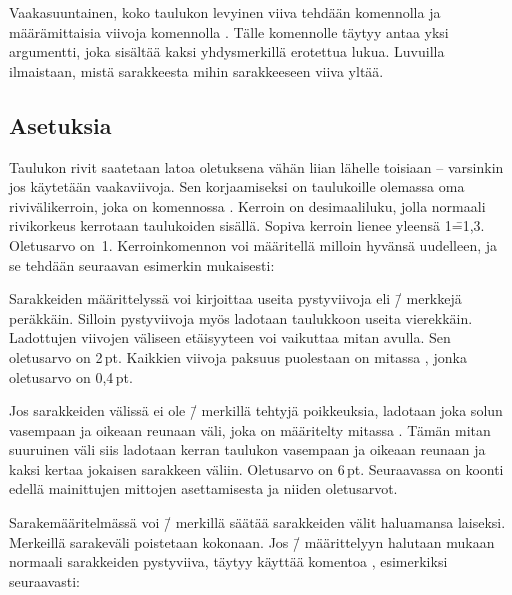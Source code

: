 Vaakasuuntainen, koko taulukon levyinen viiva tehdään komennolla
 ja määrämittaisia viivoja komennolla .
Tälle komennolle täytyy antaa yksi argumentti, joka sisältää kaksi
yhdysmerkillä erotettua lukua. Luvuilla ilmaistaan, mistä sarakkeesta
mihin sarakkeeseen viiva yltää.

\subsection{Asetuksia}

Taulukon rivit saatetaan latoa oletuksena vähän liian lähelle toisiaan
-- varsinkin jos käytetään vaakaviivoja. Sen korjaamiseksi on
taulukoille olemassa oma rivivälikerroin, joka on komennossa
. Kerroin on desimaaliluku, jolla normaali
rivikorkeus kerrotaan taulukoiden sisällä. Sopiva kerroin lienee yleensä
1\==1,3. Oletusarvo on~1. Kerroinkomennon voi määritellä milloin hyvänsä
uudelleen, ja se tehdään seuraavan esimerkin mukaisesti:

\begin{koodilohkosis}
\renewcommand{\arraystretch}{1.3}
\end{koodilohkosis}

\noindent
Sarakkeiden määrittelyssä voi kirjoittaa useita pystyviivoja eli
\koodi{|}\=/ merkkejä peräkkäin. Silloin pystyviivoja myös ladotaan
taulukkoon useita vierekkäin. Ladottujen viivojen väliseen etäisyyteen
voi vaikuttaa mitan  avulla. Sen oletusarvo on
2\,pt. Kaikkien viivoja paksuus puolestaan on mitassa
, jonka oletusarvo on 0,4\,pt.

Jos sarakkeiden välissä ei ole \=/ merkillä tehtyjä
poikkeuksia, ladotaan joka solun vasempaan ja oikeaan reunaan väli, joka
on määritelty mitassa . Tämän mitan suuruinen väli
siis ladotaan kerran taulukon vasempaan ja oikeaan reunaan ja kaksi
kertaa jokaisen sarakkeen väliin. Oletusarvo on 6\,pt. Seuraavassa on
koonti edellä mainittujen mittojen asettamisesta ja niiden oletusarvot.

\begin{koodilohkosis}
\setlength{\doublerulesep}{2pt}
\setlength{\arrayrulewidth}{.4pt}
\setlength{\tabcolsep}{6pt}
\end{koodilohkosis}

\noindent
Sarakemääritelmässä voi \=/ merkillä säätää sarakkeiden välit
haluamansa laiseksi. Merkeillä  sarakeväli poistetaan
kokonaan. Jos \=/ määrittelyyn halutaan mukaan
normaali sarakkeiden pystyviiva, täytyy käyttää komentoa
, esimerkiksi seuraavasti:

